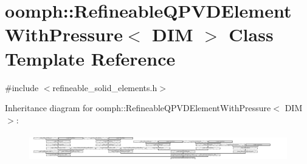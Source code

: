 \hypertarget{classoomph_1_1RefineableQPVDElementWithPressure}{}\section{oomph\+:\+:Refineable\+Q\+P\+V\+D\+Element\+With\+Pressure$<$ D\+IM $>$ Class Template Reference}
\label{classoomph_1_1RefineableQPVDElementWithPressure}


{\ttfamily \#include $<$refineable\+\_\+solid\+\_\+elements.\+h$>$}

Inheritance diagram for oomph\+:\+:Refineable\+Q\+P\+V\+D\+Element\+With\+Pressure$<$ D\+IM $>$\+:\begin{figure}[H]
\begin{center}
\leavevmode
\includegraphics[height=1.206154cm]{classoomph_1_1RefineableQPVDElementWithPressure}
\end{center}
\end{figure}
